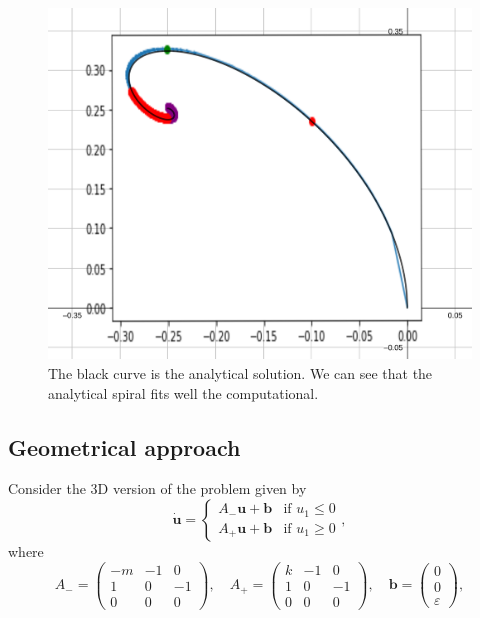 \documentclass[a4paper,preprint,11pt]{article}
\begin{document}
\begin{figure}[h]
    \centering
    \includegraphics[scale=14]{Slow_Passage/SpiralFitting.png}
    \caption{The black curve is the analytical solution. We can see that the analytical spiral fits well the computational.}
    \label{fig:spiralFitting}
\end{figure}


\break














\subsection{Geometrical approach}
 
Consider the 3D version of the problem given by 
\[
\dot{\mathbf{u}}=
  \left\{
	\begin{array}{ll}
	  A_{-}\mathbf{u}+\mathbf{b} & \text{if } u_1 \leq 0 \\
	  A_{+}\mathbf{u}+\mathbf{b} & \text{if } u_1 \geq 0 
	\end{array}
  \right.,
\]
where
\[
 A_-=\begin{pmatrix}
      -m & -1 & 0 \\
      1 & 0 & -1\\
      0 & 0 & 0
     \end{pmatrix},\quad
 A_+=\begin{pmatrix}
      k & -1 & 0 \\
      1 & 0 & -1\\
      0 & 0 & 0
     \end{pmatrix},\quad
 \mathbf{b}=\begin{pmatrix}
      0 \\
      0 \\
      \varepsilon 
     \end{pmatrix},     
\]
\end{document}
